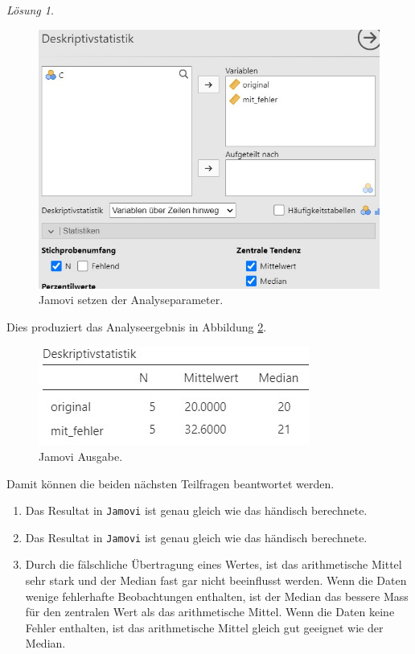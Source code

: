 \documentclass[
]{book}
\providecommand{\tightlist}{%
  \setlength{\itemsep}{0pt}\setlength{\parskip}{0pt}}
\theoremstyle{definition}
\theoremstyle{definition}
\theoremstyle{definition}
\theoremstyle{definition}
\theoremstyle{remark}
\newtheorem*{solution}{Lösung}
\begin{document}
\begin{solution}
\begin{figure}
\includegraphics[width=1\linewidth]{figures/02-exr-theorie-mdn-mean-jmv-input} \caption{Jamovi setzen der Analyseparameter.}\label{fig:sol-theorie-mdn-mean-input}
\end{figure}

Dies produziert das Analyseergebnis in Abbildung \ref{fig:sol-theorie-mdn-mean-output}.

\begin{figure}
\includegraphics[width=1\linewidth]{figures/02-exr-theorie-mdn-mean-jmv-output} \caption{Jamovi Ausgabe.}\label{fig:sol-theorie-mdn-mean-output}
\end{figure}

Damit können die beiden nächsten Teilfragen beantwortet werden.

\begin{enumerate}
\def\labelenumi{(\alph{enumi})}
\setcounter{enumi}{2}
\tightlist
\item
  Das Resultat in \texttt{Jamovi} ist genau gleich wie das händisch berechnete.
\item
  Das Resultat in \texttt{Jamovi} ist genau gleich wie das händisch berechnete.
\item
  Durch die fälschliche Übertragung eines Wertes, ist das arithmetische Mittel sehr stark und der Median fast gar nicht beeinflusst werden. Wenn die Daten wenige fehlerhafte Beobachtungen enthalten, ist der Median das bessere Mass für den zentralen Wert als das arithmetische Mittel. Wenn die Daten keine Fehler enthalten, ist das arithmetische Mittel gleich gut geeignet wie der Median.
\end{enumerate}

\end{solution}
\end{document}
